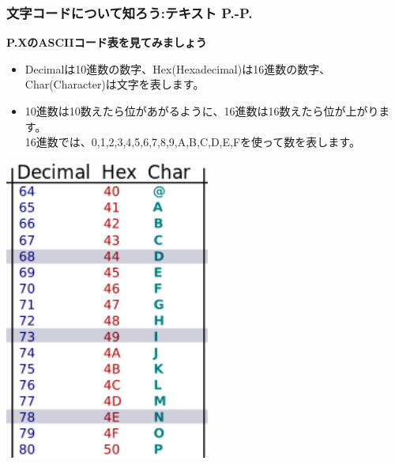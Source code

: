 \documentclass[dvipdfmx]{beamer}
\begin{document}
\begin{frame}[fragile]
	\frametitle{文字コードについて知ろう:テキスト P.\pageref{1:P:charCode}-P.\pageref{1:P:scraping}~~~}
    \large\textbf{P.XのASCIIコード表を見てみましょう}\\
    \begin{minipage}{0.55\textwidth}
        \begin{itemize}
            \item Decimalは10進数の数字、Hex(Hexadecimal)は16進数の数字、Char(Character)は文字を表します。
            \item 10進数は10数えたら位があがるように、16進数は16数えたら位が上がります。\\16進数では、0,1,2,3,4,5,6,7,8,9,A,B,C,D,E,Fを使って数を表します。
        \end{itemize}
    \end{minipage}
    \hfill
    \begin{minipage}{0.4\textwidth}
        {\upshape
            \includegraphics[height=0.7\textheight]{slide08-img005.png}}
    \end{minipage}
\end{frame}
\end{document}
